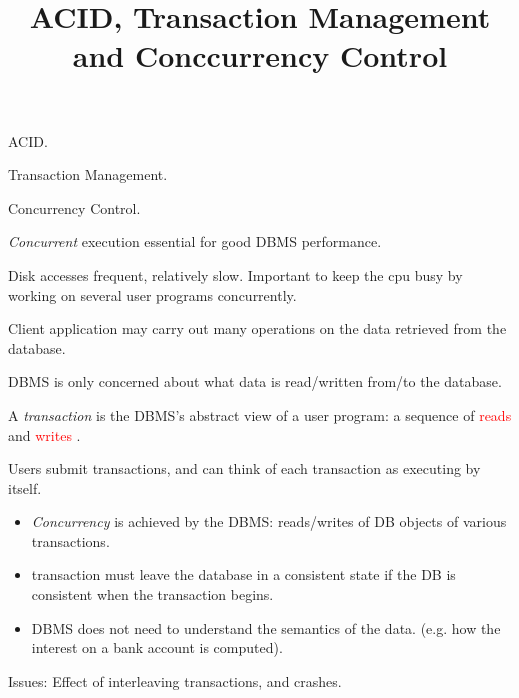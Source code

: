 \documentclass{beamer}
\title{ACID, Transaction Management and Conccurrency Control }
\author{ }
\institute{Hogeschool Rotterdam \\ 
Rotterdam, Netherlands}
\date{}
\newcommand{\red}[1]{
\textcolor{red}{#1}
}
\begin{document}
\maketitle

\begin{slide}{
\item ACID.
\item Transaction Management.
\item Concurrency Control.
}\end{slide}

\begin{slide}{
\item \emph{Concurrent} execution essential for good DBMS performance.
\item Disk accesses frequent, relatively slow. Important to keep the cpu busy by working on several user programs concurrently.
\item Client application may carry out many operations on the data retrieved from the database.
\item DBMS is only concerned about what data is read/written from/to the database.
\item A \textit{transaction} is the DBMS’s abstract view of a user program:  a sequence of \red{reads} and \red{writes}.
}\end{slide}


\begin{slide}{
\item Users submit transactions, and can think of each transaction as executing by itself.
\begin{itemize}
	\item \emph{Concurrency} is achieved by the DBMS: reads/writes of DB objects of various transactions.
	\item transaction must leave the database in a consistent state if the DB is consistent when the transaction begins.
	\item DBMS does not need to understand the semantics of the data.  (e.g. how the interest on a bank account is computed).	
\end{itemize}
\item Issues:  Effect of interleaving transactions, and crashes.
}\end{slide}
\end{document}
